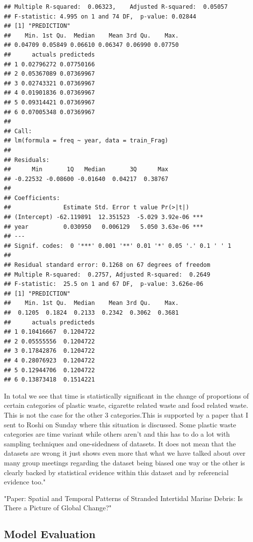 \documentclass[10pt]{article}\usepackage[]{graphicx}\usepackage[]{color}
\makeatletter
\newenvironment{kframe}{%
 \def\at@end@of@kframe{}%
 \ifinner\ifhmode%
  \def\at@end@of@kframe{\end{minipage}}%
  \begin{minipage}{\columnwidth}%
 \fi\fi%
 \def\FrameCommand##1{\hskip\@totalleftmargin \hskip-\fboxsep
 \colorbox{shadecolor}{##1}\hskip-\fboxsep
     \hskip-\linewidth \hskip-\@totalleftmargin \hskip\columnwidth}%
 \MakeFramed {\advance\hsize-\width
   \@totalleftmargin\z@ \linewidth\hsize
   \@setminipage}}%
 {\par\unskip\endMakeFramed%
 \at@end@of@kframe}
\newenvironment{knitrout}{}{} %
\makeatother
\begin{document}
\begin{knitrout}
\begin{kframe}
\begin{verbatim}
## Multiple R-squared:  0.06323,	Adjusted R-squared:  0.05057 
## F-statistic: 4.995 on 1 and 74 DF,  p-value: 0.02844
## [1] "PREDICTION"
##    Min. 1st Qu.  Median    Mean 3rd Qu.    Max. 
## 0.04709 0.05849 0.06610 0.06347 0.06990 0.07750
##      actuals predicteds
## 1 0.02796272 0.07750166
## 2 0.05367089 0.07369967
## 3 0.02743321 0.07369967
## 4 0.01901836 0.07369967
## 5 0.09314421 0.07369967
## 6 0.07005348 0.07369967
## 
## Call:
## lm(formula = freq ~ year, data = train_Frag)
## 
## Residuals:
##      Min       1Q   Median       3Q      Max 
## -0.22532 -0.08600 -0.01640  0.04217  0.38767 
## 
## Coefficients:
##               Estimate Std. Error t value Pr(>|t|)    
## (Intercept) -62.119891  12.351523  -5.029 3.92e-06 ***
## year          0.030950   0.006129   5.050 3.63e-06 ***
## ---
## Signif. codes:  0 '***' 0.001 '**' 0.01 '*' 0.05 '.' 0.1 ' ' 1
## 
## Residual standard error: 0.1268 on 67 degrees of freedom
## Multiple R-squared:  0.2757,	Adjusted R-squared:  0.2649 
## F-statistic:  25.5 on 1 and 67 DF,  p-value: 3.626e-06
## [1] "PREDICTION"
##    Min. 1st Qu.  Median    Mean 3rd Qu.    Max. 
##  0.1205  0.1824  0.2133  0.2342  0.3062  0.3681
##      actuals predicteds
## 1 0.10416667  0.1204722
## 2 0.05555556  0.1204722
## 3 0.17842876  0.1204722
## 4 0.28076923  0.1204722
## 5 0.12944706  0.1204722
## 6 0.13873418  0.1514221
\end{verbatim}
\end{kframe}
\end{knitrout}

In total we see that time is statistically significant in the change of proportions of certain categories of plastic waste, cigarette related waste and food related waste. This is not the case for the other 3 categories.This is supported by a paper that I sent to Roshi on Sunday where this situation is discussed. Some plastic waste
categories are time variant while others aren't and this has to do a  lot with sampling techniques and one-sidedness of datasets. It does not mean that the datasets are wrong it just shows even more that what we have talked about over many group meetings regarding the dataset being biased one way or the other is clearly backed by statistical evidence within this dataset and by referencial evidence too."

"Paper: Spatial and Temporal Patterns of Stranded Intertidal Marine Debris:
Is There a Picture of Global Change?"



\subsection{Model Evaluation}
\end{document}
